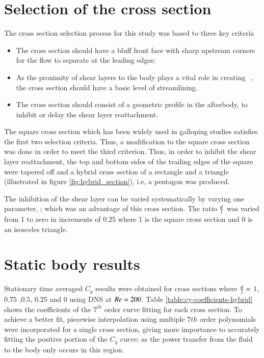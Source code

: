 \section{Selection of the cross section}

The cross section selection process for this study was based to three key criteria 

\begin{itemize}
	\item The cross section should have a bluff front face with sharp upstream corners for the flow to separate at the leading edges;
	
	\item As the proximity of shear layers to the body plays a vital role in creating \cy\ \citep{Parkinson1989}, the cross section should have a basic level of streamlining.
	
	\item The cross section should consist of a geometric profile in the afterbody, to inhibit or delay the shear layer reattachment.   
\end{itemize}


The square cross section which has been widely used in galloping studies satisfies the first two selection criteria. Thus, a modification to the square cross section was done in order to meet the third criterion. Thus, in order to inhibit the shear layer reattachment, the top and bottom sides of the trailing edges of the square were tapered off and a hybrid cross section of a rectangle and a triangle (illustrated in figure \ref{fig:hybrid_section}), i.e, a pentagon was produced.



The inhibition of the shear layer can be varied systematically by varying one parameter, \ratio; which was an advantage of this cross section. The ratio $\frac{d}{l}$ was varied from 1 to zero in increments of 0.25 where 1 is the square cross section and 0 is an isosceles triangle. 


\section{Static body results}




Stationary time averaged $C_y$ results were obtained for cross sections where $\frac{d}{l}=$ $1$, $0.75$ ,$0.5$, $0.25$ and $0$ using DNS at $Re=200$. Table \ref{table:cy-coefficients-hybrid} shows the coefficients of the $7^{th}$ order curve fitting for each cross section. To achieve a better fit, piecewise interpolation using multiple $7th$ order polynomials were incorporated for a single cross section, giving more importance to accurately fitting the positive portion of the $C_{y}$ curve; as the power transfer from the fluid to the body only occurs in this region.


